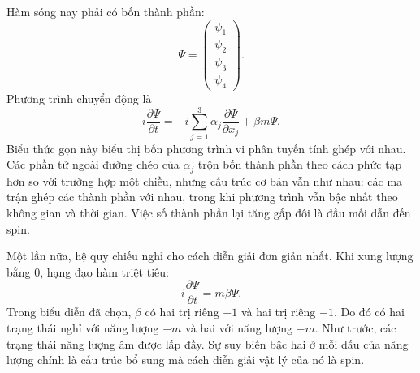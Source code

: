 Hàm sóng nay phải có bốn thành phần:
\begin{equation}
\Psi=
\begin{pmatrix}
\psi_1\\
\psi_2\\
\psi_3\\
\psi_4
\end{pmatrix}.
\end{equation}
Phương trình chuyển động là
\begin{equation}
i\frac{\partial\Psi}{\partial t}
=
-i\sum_{j=1}^{3}\alpha_j
\frac{\partial\Psi}{\partial x_j}
+\beta m\Psi.
\end{equation}
Biểu thức gọn này biểu thị bốn phương trình vi phân tuyến tính ghép với nhau. Các phần tử ngoài đường chéo của \(\alpha_j\) trộn bốn thành phần theo cách phức tạp hơn so với trường hợp một chiều, nhưng cấu trúc cơ bản vẫn như nhau: các ma trận ghép các thành phần với nhau, trong khi phương trình vẫn bậc nhất theo không gian và thời gian. Việc số thành phần lại tăng gấp đôi là đầu mối dẫn đến spin.

\begin{classroomqa}
\end{classroomqa}

Một lần nữa, hệ quy chiếu nghỉ cho cách diễn giải đơn giản nhất. Khi xung lượng bằng 0, hạng đạo hàm triệt tiêu:
\begin{equation}
i\frac{\partial\Psi}{\partial t}=m\beta\Psi.
\end{equation}
Trong biểu diễn đã chọn, \(\beta\) có hai trị riêng \(+1\) và hai trị riêng \(-1\). Do đó có hai trạng thái nghỉ với năng lượng \(+m\) và hai với năng lượng \(-m\). Như trước, các trạng thái năng lượng âm được lấp đầy. Sự suy biến bậc hai ở mỗi dấu của năng lượng chính là cấu trúc bổ sung mà cách diễn giải vật lý của nó là spin.

\begin{classroomqa}
\end{classroomqa}

